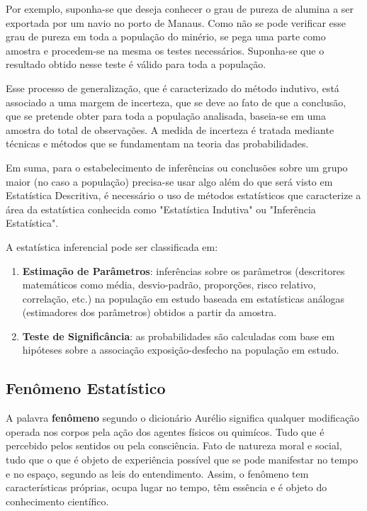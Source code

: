 Por exemplo, suponha-se que deseja conhecer o grau de pureza de alumina a ser exportada por um navio no porto de Manaus. Como não se pode verificar esse grau de pureza em toda a população do minério, se pega uma parte como amostra e procedem-se na mesma os testes necessários. Suponha-se que o resultado obtido nesse teste é válido para toda a população.\vskip0.3cm




\newpage

Esse processo de generalização, que é caracterizado do método indutivo, está associado a uma margem de incerteza, que se deve ao fato de que a conclusão, que se pretende obter para toda a população analisada, baseia-se em uma amostra do total de observações. A medida de incerteza é tratada mediante técnicas e métodos que se fundamentam na teoria das probabilidades.\vskip0.3cm


Em suma, para o estabelecimento de inferências ou conclusões sobre um grupo maior (no caso a população) precisa-se usar algo além do que será visto em Estatística Descritiva, é necessário o uso de métodos estatísticos que caracterize a área da estatística conhecida como "Estatística Indutiva" ou "Inferência Estatística".\vskip0.3cm

A estatística inferencial pode ser classificada em:

\begin{enumerate}
  \item \textbf{Estimação de Parâmetros}: inferências sobre os parâmetros (descritores matemáticos como média, desvio-padrão, proporções, risco relativo, correlação, etc.) na população em estudo baseada em estatísticas análogas (estimadores dos parâmetros) obtidos a partir da amostra.
  \item \textbf{Teste de Significância}: as probabilidades são calculadas com base em hi\-pó\-te\-ses sobre a associação exposição-desfecho na população em estudo.
\end{enumerate}


\subsection{Fenômeno Estatístico}

A palavra \textbf{fenômeno} segundo o dicionário Aurélio significa qualquer modificação operada nos corpos pela ação dos agentes físicos ou quimícos. Tudo que é percebido pelos sentidos ou pela consciência. Fato de natureza moral e social, tudo que o que é objeto de experiência possível que se pode manifestar no tempo e no espaço, segundo as leis do entendimento. Assim, o fenômeno tem características próprias, ocupa lugar no tempo, têm essência e é objeto do conhecimento científico. \vskip0.3cm   

